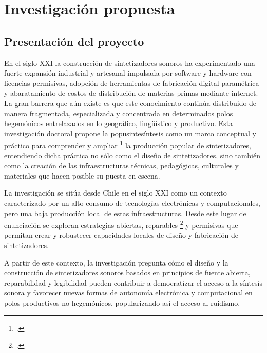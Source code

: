 \documentclass[../proyecto.tex]{subfiles}
\begin{document}
\section{Investigación propuesta}


\subsection{Presentación del proyecto}



En el siglo XXI la construcción de sintetizadores sonoros ha experimentado una fuerte expansión industrial y artesanal impulsada por software y hardware con licencias permisivas, adopción de herramientas de fabricación digital paramétrica y abaratamiento de costos de distribución de materias primas mediante internet. La gran barrera que aún existe es que este conocimiento continúa distribuido de manera fragmentada, especializada y concentrada en determinados polos hegemónicos entrelazados en lo geográfico, lingüístico y productivo. Esta investigación doctoral propone la popusintesíntesis como un marco conceptual y práctico para comprender y ampliar \footcite{ahmed_fenomenologia_2024} la producción popular de sintetizadores, entendiendo dicha práctica no sólo como el diseño de sintetizadores, sino también como la creación de las infraestructuras técnicas, pedagógicas,  culturales y materiales que hacen posible su puesta en escena.

La investigación se sitúa desde Chile en el siglo XXI como un contexto caracterizado por un alto consumo de tecnologías electrónicas y computacionales, pero una baja producción local de estas infraestructuras. Desde este lugar de enunciación se exploran estrategias abiertas, reparables \footcite{daggett_birth_2019} y permisivas que permitan crear y robustecer capacidades locales de diseño y fabricación de sintetizadores.


A partir de este contexto, la investigación pregunta cómo el diseño y la construcción de sintetizadores sonoros basados en principios de fuente abierta, reparabilidad y legibilidad pueden contribuir a democratizar el acceso a la síntesis sonora y favorecer nuevas formas de autonomía electrónica y computacional en polos productivos no hegemónicos, popularizando así el acceso al ruidismo.
\end{document}
